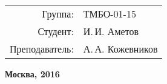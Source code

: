 \begin{titlepage}
	\begin{flushright}
	  \begin{tabular}{rl}
            Группа: & ТМБО-01-15\\
			Студент: & И.\,И. Аметов \\
			Преподаватель: & А.\,А. Кожевников \\
		\end{tabular}
	\end{flushright}

\vfill

	\begin{center} %
		\bfseries
		Москва, 2016
	\end{center}
	
\end{titlepage} 

